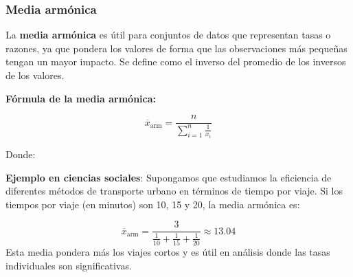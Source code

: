 \documentclass[
  letterpaper,
  DIV=11,
  numbers=noendperiod]{scrreprt}
\begin{document}
\subsubsection{Media armónica}\label{media-armuxf3nica}

La \textbf{media armónica} es útil para conjuntos de datos que
representan tasas o razones, ya que pondera los valores de forma que las
observaciones más pequeñas tengan un mayor impacto. Se define como el
inverso del promedio de los inversos de los valores.

\begin{tcolorbox}[enhanced jigsaw, toprule=.15mm, opacitybacktitle=0.6, toptitle=1mm, arc=.35mm, left=2mm, title=\textcolor{quarto-callout-warning-color}{\faExclamationTriangle}\hspace{0.5em}{Warning}, titlerule=0mm, leftrule=.75mm, rightrule=.15mm, coltitle=black, bottomtitle=1mm, bottomrule=.15mm, colframe=quarto-callout-warning-color-frame, opacityback=0, colback=white, breakable, colbacktitle=quarto-callout-warning-color!10!white]

\textbf{Fórmula de la media armónica:}

\[\overline{x}_{\text{arm}} = \frac{n}{\sum_{i=1}^{n} \frac{1}{x_i}}\]

Donde:

\end{tcolorbox}

\begin{tcolorbox}[enhanced jigsaw, toprule=.15mm, opacitybacktitle=0.6, toptitle=1mm, arc=.35mm, left=2mm, title=\textcolor{quarto-callout-tip-color}{\faLightbulb}\hspace{0.5em}{Tip}, titlerule=0mm, leftrule=.75mm, rightrule=.15mm, coltitle=black, bottomtitle=1mm, bottomrule=.15mm, colframe=quarto-callout-tip-color-frame, opacityback=0, colback=white, breakable, colbacktitle=quarto-callout-tip-color!10!white]

\textbf{Ejemplo en ciencias sociales}: Supongamos que estudiamos la
eficiencia de diferentes métodos de transporte urbano en términos de
tiempo por viaje. Si los tiempos por viaje (en minutos) son 10, 15 y 20,
la media armónica es:

\[\overline{x}_{\text{arm}} = \frac{3}{\frac{1}{10} + \frac{1}{15} + \frac{1}{20}} \approx 13.04\]
Esta media pondera más los viajes cortos y es útil en análisis donde las
tasas individuales son significativas.

\end{tcolorbox}
\end{document}
